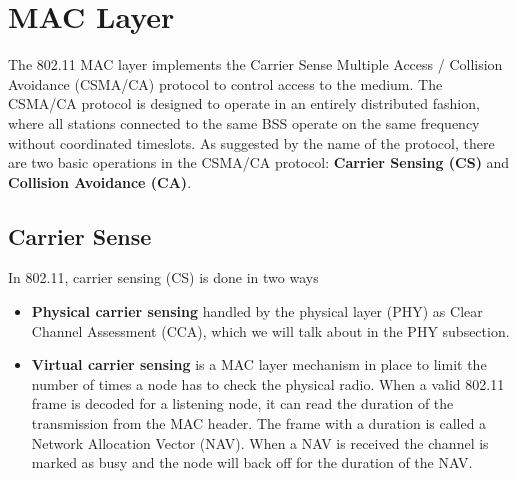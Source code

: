 \documentclass[a4paper,UKenglish]{report}
\begin{document}
\section{MAC Layer}
The 802.11 MAC layer implements the Carrier Sense Multiple Access / Collision Avoidance (CSMA/CA) protocol to control access to the medium.
The CSMA/CA protocol is designed to operate in an entirely distributed fashion, where all stations connected to the same BSS  operate on
the same frequency without coordinated timeslots. As suggested by the name of the protocol, there are two basic operations in the CSMA/CA protocol:
\textbf{Carrier Sensing (CS)} and \textbf{Collision Avoidance (CA)}. 

\subsection{Carrier Sense}
In 802.11, carrier sensing (CS) is done in two ways
\begin{itemize}
	\item \textbf{Physical carrier sensing} handled by the physical layer (PHY) as Clear Channel Assessment (CCA), which we will talk about in the PHY subsection.
	\item \textbf{Virtual carrier sensing} is a MAC layer mechanism in place to limit the number of times
		a node has to check the physical radio. When a valid 802.11 frame is decoded for a listening node, it can read the duration of
		the transmission from the MAC header. The frame with a duration is called a Network Allocation Vector (NAV). When a NAV is received 
		the channel is marked as busy and the node will back off for the duration of the NAV. 
\end{itemize} 
\end{document}
